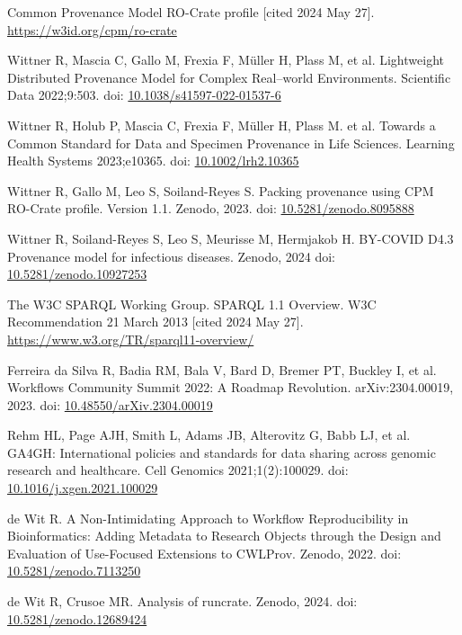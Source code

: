 \documentclass[10pt,letterpaper]{article}
\begin{document}
\begin{thebibliography}{10}
\begin{small}
Common Provenance Model RO-Crate profile [cited 2024 May 27].
\url{https://w3id.org/cpm/ro-crate}

Wittner R, Mascia C, Gallo M, Frexia F, Müller H, Plass M, et al.
Lightweight Distributed Provenance Model for Complex Real--world Environments.
Scientific Data 2022;9:503.
doi: \href{https://doi.org/10.1038/s41597-022-01537-6}{10.1038/s41597-022-01537-6}

Wittner R, Holub P, Mascia C, Frexia F, Müller H, Plass M. et al.
Towards a Common Standard for Data and Specimen Provenance in Life Sciences.
Learning Health Systems 2023;e10365.
doi: \href{https://doi.org/10.1002/lrh2.10365}{10.1002/lrh2.10365}

Wittner R, Gallo M, Leo S, Soiland-Reyes S.
Packing provenance using CPM RO-Crate profile. Version 1.1.
Zenodo, 2023.
doi: \href{https://doi.org/10.5281/zenodo.8095888}{10.5281/zenodo.8095888}

Wittner R, Soiland-Reyes S, Leo S, Meurisse M, Hermjakob H. 
BY-COVID D4.3 Provenance model for infectious diseases. 
Zenodo, 2024 
doi: \href{https://doi.org/10.5281/zenodo.10927253}{10.5281/zenodo.10927253}

The W3C SPARQL Working Group.
SPARQL 1.1 Overview. W3C Recommendation 21 March 2013 [cited 2024 May 27].
\url{https://www.w3.org/TR/sparql11-overview/}

Ferreira da Silva R, Badia RM, Bala V, Bard D, Bremer PT, Buckley I, et al.
Workflows Community Summit 2022: A Roadmap Revolution.
arXiv:2304.00019, 2023.
doi: \href{https://doi.org/10.48550/arXiv.2304.00019}{10.48550/arXiv.2304.00019}

Rehm HL, Page AJH, Smith L, Adams JB, Alterovitz G, Babb LJ, et al.
GA4GH: International policies and standards for data sharing across genomic research and healthcare.
Cell Genomics 2021;1(2):100029.
doi: \href{https://doi.org/10.1016/j.xgen.2021.100029}{10.1016/j.xgen.2021.100029}

de Wit R.
A Non-Intimidating Approach to Workflow Reproducibility in Bioinformatics: Adding Metadata to Research Objects through the Design and Evaluation of Use-Focused Extensions to CWLProv.
Zenodo, 2022.
doi: \href{https://doi.org/10.5281/zenodo.7113250}{10.5281/zenodo.7113250}

de Wit R, Crusoe MR.
Analysis of runcrate.
Zenodo, 2024.
doi: \href{https://doi.org/10.5281/zenodo.12689424}{10.5281/zenodo.12689424}


\end{small}
\end{thebibliography}
\end{document}
